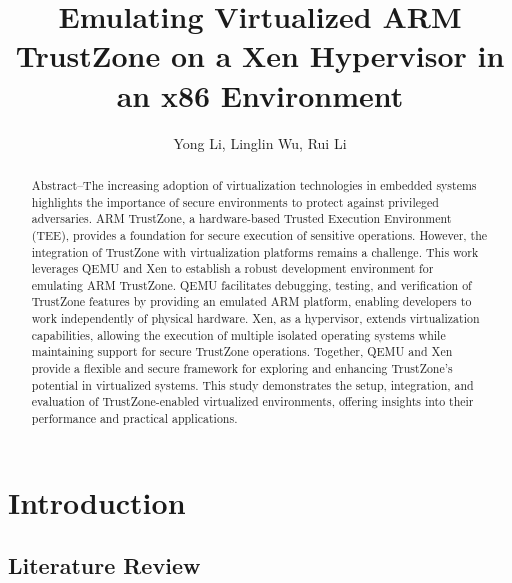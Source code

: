\documentclass[acmtog]{acmart}
\begin{document}
\title{Emulating Virtualized ARM TrustZone on a Xen Hypervisor in an x86 Environment}


\author{Yong Li, Linglin Wu, Rui Li}

\renewcommand{\shortauthors}{Yong Li, Linglin Wu, Rui Li}


\begin{abstract}
  Abstract--The increasing adoption of virtualization technologies in embedded systems highlights the importance of secure environments to protect against privileged adversaries. ARM TrustZone, a hardware-based Trusted Execution Environment (TEE), provides a foundation for secure execution of sensitive operations. However, the integration of TrustZone with virtualization platforms remains a challenge. This work leverages QEMU and Xen to establish a robust development environment for emulating ARM TrustZone. QEMU facilitates debugging, testing, and verification of TrustZone features by providing an emulated ARM platform, enabling developers to work independently of physical hardware. Xen, as a hypervisor, extends virtualization capabilities, allowing the execution of multiple isolated operating systems while maintaining support for secure TrustZone operations. Together, QEMU and Xen provide a flexible and secure framework for exploring and enhancing TrustZone's potential in virtualized systems. This study demonstrates the setup, integration, and evaluation of TrustZone-enabled virtualized environments, offering insights into their performance and practical applications.
  \end{abstract}


    
\maketitle

\section{Introduction}



\subsection{Literature Review}
\end{document}
